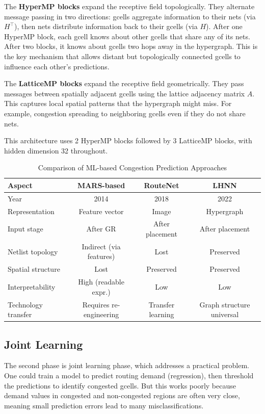 \documentclass[sigconf]{acmart}
\begin{document}
The \textbf{HyperMP blocks} expand the receptive field topologically. 
They alternate message passing in two directions: gcells aggregate 
information to their nets (via $H^\top$), then nets distribute 
information back to their gcells (via $H$). After one HyperMP block, 
each gcell knows about other gcells that share any of its nets. After 
two blocks, it knows about gcells two hops away in the hypergraph. 
This is the key mechanism that allows distant but topologically 
connected gcells to influence each other's predictions.

The \textbf{LatticeMP blocks} expand the receptive field geometrically. 
They pass messages between spatially adjacent gcells using the lattice 
adjacency matrix $A$. This captures local spatial patterns that the 
hypergraph might miss. For example, congestion spreading to neighboring 
gcells even if they do not share nets.

This architecture uses 2 HyperMP blocks followed by 3 LatticeMP blocks, 
with hidden dimension 32 throughout.

\begin{table}[t]
\centering
\caption{Comparison of ML-based Congestion Prediction Approaches}
\label{tab:comparison}
\begin{tabular}{l|c|c|c}
\hline
\textbf{Aspect} & \textbf{MARS-based} & \textbf{RouteNet} & \textbf{LHNN} \\
\hline
Year & 2014 & 2018 & 2022 \\
Representation & Feature vector & Image & Hypergraph \\
Input stage & After GR & After placement & After placement \\
Netlist topology & Indirect (via features) & Lost & Preserved \\
Spatial structure & Lost & Preserved & Preserved \\
Interpretability & High (readable expr.) & Low & Low \\
Technology transfer & Requires re-engineering & Transfer learning & Graph structure universal \\
\hline
\end{tabular}
\end{table}

\subsection{Joint Learning}

The second phase is joint learning phase, which addresses a practical problem. One could 
train a model to predict routing demand (regression), then threshold 
the predictions to identify congested gcells. But this works poorly 
because demand values in congested and non-congested regions are often 
very close, meaning small prediction errors lead to many misclassifications.
\end{document}

